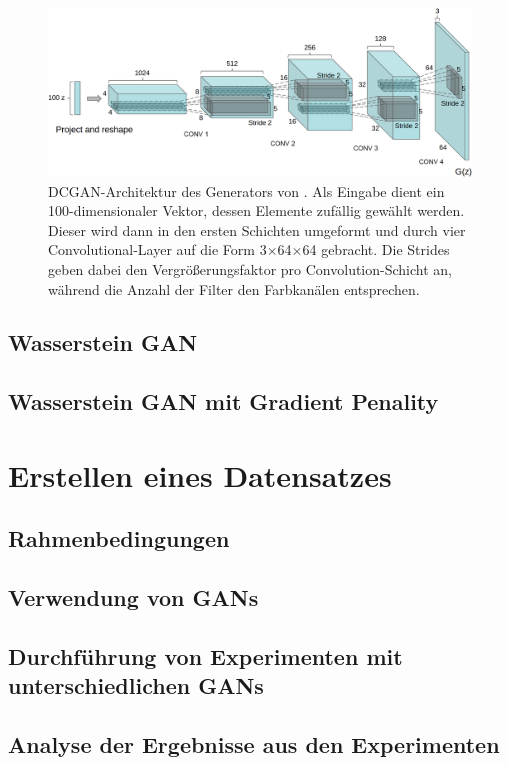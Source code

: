 \documentclass{hsflensburg}
\begin{document}
  \begin{figure}
    \includegraphics[width=\textwidth]{images/dcgan-architecture}
    \caption{DCGAN-Architektur des Generators von
    \cite{radford2016unsupervised}. Als Eingabe dient ein 100-dimensionaler
    Vektor, dessen Elemente zufällig gewählt werden. Dieser wird dann in den
    ersten Schichten umgeformt und durch vier Convolutional-Layer auf die Form
    3$\times$64$\times$64 gebracht. Die Strides geben dabei den
    Vergrößerungsfaktor pro Convolution-Schicht an, während die Anzahl der
    Filter den Farbkanälen entsprechen.}
  \end{figure}

  \section{Wasserstein GAN}
  \section{Wasserstein GAN mit Gradient Penality}

  \chapter{Erstellen eines Datensatzes}
  \section{Rahmenbedingungen}
  \section{Verwendung von GANs}
  \section{Durchführung von Experimenten mit unterschiedlichen GANs}
  \section{Analyse der Ergebnisse aus den Experimenten}
\end{document}
